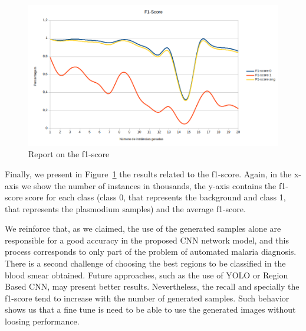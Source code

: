 \begin{figure}[h]
\caption{Report on the f1-score}
\label{fig:f1score}
\begin{center}
\includegraphics[scale=0.40]{./images/figura3.png} \end{center}
\end{figure}

 Finally, we present in Figure~\ref{fig:f1score} the results related to the f1-score. Again, in the x-axis we show the number of instances in thousands, the y-axis contains the f1-score score for each class (class 0, that represents the background and class 1, that represents the plasmodium samples) and the average f1-score. 




We reinforce that, as we claimed, the use of the generated samples alone are responsible for a good accuracy in the proposed CNN network model, and this process corresponds to only part of the problem of automated malaria diagnosis. There is a second challenge of choosing the best regions to be classified in the blood smear obtained. Future approaches, such as the use of YOLO or Region Based CNN, may present better results. Nevertheless, the recall and specially the f1-score tend to increase with the number of generated samples. Such behavior shows us that a fine tune is need to be able to use the generated images without loosing performance. 